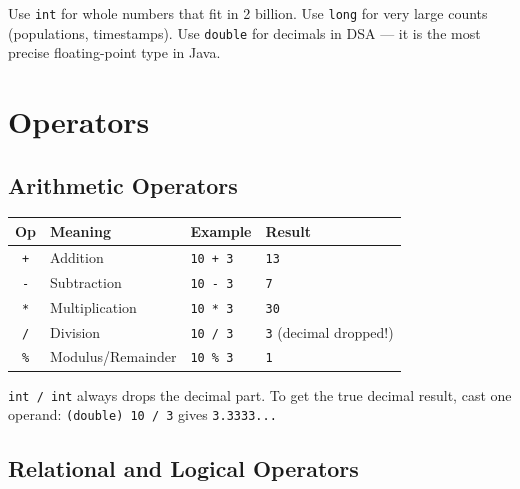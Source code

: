 \documentclass[12pt,a4paper,oneside]{book}
\begin{document}
\begin{tipbox}
Use \texttt{int} for whole numbers that fit in 2 billion. Use \texttt{long} for very large counts (populations, timestamps). Use \texttt{double} for decimals in DSA --- it is the most precise floating-point type in Java.
\end{tipbox}

\section{Operators}

\subsection{Arithmetic Operators}

\begin{center}
\begin{tabular}{clll}
\toprule
\textbf{Op} & \textbf{Meaning} & \textbf{Example} & \textbf{Result}\\
\midrule
\texttt{+}  & Addition        & \texttt{10 + 3}  & \texttt{13}\\
\texttt{-}  & Subtraction     & \texttt{10 - 3}  & \texttt{7}\\
\texttt{*}  & Multiplication  & \texttt{10 * 3}  & \texttt{30}\\
\texttt{/}  & Division        & \texttt{10 / 3}  & \texttt{3} (decimal dropped!)\\
\texttt{\%} & Modulus/Remainder & \texttt{10 \% 3} & \texttt{1}\\
\bottomrule
\end{tabular}
\end{center}

\begin{tipbox}
\texttt{int / int} always drops the decimal part. To get the true decimal result, cast one operand: \texttt{(double) 10 / 3} gives \texttt{3.3333...}
\end{tipbox}

\subsection{Relational and Logical Operators}
\end{document}
